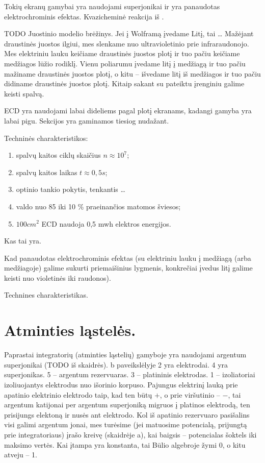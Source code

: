 Tokių ekranų gamybai yra naudojami superjonikai ir yra panaudotas
elektrochrominis efektas. Kvazicheminė reakcija iš .

TODO Juostinio modelio brėžinys.
Jei į Wolframą įvedame Litį, tai … Mažėjant draustinės juostos ilgiui,
mes slenkame nuo ultravioletinio prie infraraudonojo. Mes elektriniu
lauku keičiame draustinės juostos plotį ir tuo pačiu keičiame medžiagos
lūžio rodiklį. Vienu poliarumu įvedame litį į medžiagą ir tuo pačiu
mažiname draustinės juostos plotį, o kitu – išvedame litį iš medžiagos
ir tuo pačiu didiname draustinės juostos plotį. Kitaip sakant
su  pateiktu įrenginiu galime keisti spalvą.

ECD yra naudojami labai dideliems pagal plotį ekranams, kadangi
gamyba yra labai pigu. Sekcijos yra gaminamos tiesiog nudažant.

Techninės charakteristikos:
\begin{enumerate}
  \item spalvų kaitos ciklų skaičius $n\approx 10^{7}$;
  \item spalvų kaitos laikas $t \approx 0,5 s$;
  \item optinio tankio pokytis, tenkantis …
  \item valdo nuo 85 iki 10 \% praeinančios matomos šviesos;
  \item $100 cm^{2}$ ECD naudoja 0,5 mwh elektros energijos.
\end{enumerate}

\begin{remember}
  \item Kas tai yra.
  \item Kad panaudotas elektrochrominis efektas (su elektriniu lauku
    į medžiagą (arba medžiagoje) galime sukurti priemaišinius
    lygmenis, konkrečiai įvedus litį galime keisti nuo violetinės iki
    raudonos).
\item Technines charakteristikas.
\end{remember}

\section{Atminties ląstelės.}

Paprastai integratorių (atminties ląstelių) gamyboje yra naudojami 
argentum superjonikai (TODO iš skaidrės). b paveikslėlyje 2 yra
elektrodai. 4 yra superjonikas. 5 – argentum rezervuaras. 3 – platininis
elektrodas. 1 – izoliatoriai izoliuojantys elektrodus nuo išorinio
korpuso. Pajungus elektrinį lauką prie apatinio elektrinio elektrodo
taip, kad ten būtų $+$, o prie viršutinio – $-$, tai argentum katijonai
per argentum superjoniką migruos į platinos elektrodą, ten prisijungs
elektoną ir nusės ant elektrodo. Kol iš apatinio rezervuaro pasišalins
visi galimi argentum jonai, mes turėsime (jei matuosime potencialą,
prijungtą prie integratoriaus) įrašo kreivę (skaidrėje a), kai
baigsis – potencialas šoktels iki maksimo vertės. Kai įtampa
yra konstanta, tai Būlio algebroje žymi 0, o kitu atveju – 1.

